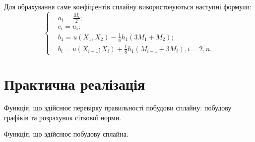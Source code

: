 \documentclass[titlepage]{article}
\edef\name{spl\textunderscore23.m}
\newcommand\makelisting[1]{\begingroup\spacing{1} \vspace{1cm} \endgroup}
\newcommand\mysection[1]{\begingroup\center\section*{#1}\endgroup}
\newcommand\eqc[1]{\begin{equation*}\begin{cases}#1\end{cases}\end{equation*}}
\begin{document}
Для обрахування саме коефіціентів сплайну використовуються наступні формули:
\eqc{
&a_i = \frac{M_i}{2};\\
&c_i = u_i;\\
&b_1 = u(X_1, X_2) - \frac{1}{8}h_1(3M_1 + M_2);\\
&b_i = u(X_{i-1};X_i) + \frac{1}{8}h_1(M_{i-1} + 3M_i), i=\overline{2,n}.
}
\mysection{Практична реалізація}

Функція, що здійснює перевірку правильності побудови сплайну: побудову графіків та розрахунок сіткової норми.
\makelisting{perevirka.m}

Функція, що здійснює побудову сплайна.
\begingroup{} \vspace{1cm} \endgroup
\end{document}
